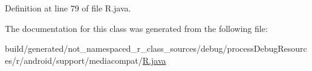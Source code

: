 Definition at line 79 of file R.\+java.



The documentation for this class was generated from the following file\+:\begin{DoxyCompactItemize}
\item 
build/generated/not\+\_\+namespaced\+\_\+r\+\_\+class\+\_\+sources/debug/process\+Debug\+Resources/r/android/support/mediacompat/\mbox{\hyperlink{android_2support_2mediacompat_2_r_8java}{R.\+java}}\end{DoxyCompactItemize}
